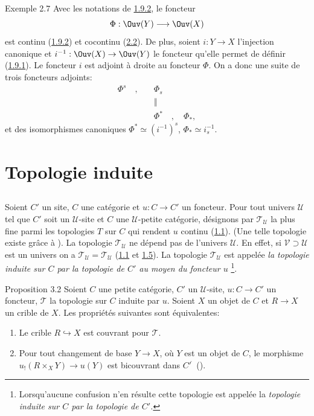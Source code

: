 \begin{enonce*}[remark]{Exemple 2.7}
Avec les notations de \hyperref[III.exem1.9.2]{1.9.2}, le foncteur
$$
\Phi:\Ouv(Y)\longrightarrow \Ouv(X)
$$
est continu (\hyperref[III.exem1.9.2]{1.9.2}) et cocontinu (\hyperref[III.prop2.2]{2.2}).
De plus, soient $i:Y\rightarrow X$ l'injection\pageoriginale
canonique et $i^{-1}:\Ouv(X)\rightarrow \Ouv(Y)$ le foncteur qu'elle
permet de définir (\hyperref[III.exem1.9.1]{1.9.1}). Le foncteur $i$ est
adjoint à droite au foncteur $\Phi$. On a donc une suite de trois
foncteurs adjoints:
\begin{align*}
\Phi^s\quad ,\quad & \Phi_s\\
        & ‖\\
        &\Phi^{\ast}\quad,\quad \Phi_{\ast},
\end{align*}
et des isomorphismes canoniques $\Phi^{\ast}\simeq (i^{-1})^s$,
$\Phi_{\ast}\simeq i^{-1}_s$.
\end{enonce*}

\section{Topologie induite}

\subsection{}
Soient $C'$ un site, $C$ une catégorie et $u:C\rightarrow C'$ un
foncteur. Pour tout univers $𝒰$ tel que $C'$ soit un
$𝒰$-site et $C$ une $𝒰$-petite catégorie, désignons
par $𝒯_{𝒰}$ la plus fine parmi les topologies $T$ sur $C$
qui rendent $u$ continu (\hyperref[III.def1.1]{1.1}). (Une telle topologie
existe grâce à ). La topologie $𝒯_{𝒰}$ ne
dépend pas de l'univers $𝒰$. En effet, si $𝒱\supset
𝒰$ est un univers on a $𝒯_{𝒰}=𝒯_{𝒰}$
(\hyperref[III.def1.1]{1.1} et \hyperref[III.prop1.5]{1.5}). La topologie
$𝒯_{𝒰}$ est appelée \emph{la topologie
  induite sur $C$ par la topologie de $C'$ au moyen du foncteur $u$}
  \footnote[1]{Lorsqu'aucune confusion n'en résulte cette topologie
    est appelée la \emph{topologie induite sur $C$ par la topologie
      de $C'$.}}.

\begin{enonce*}{Proposition 3.2}
Soient $C$ une petite catégorie, $C'$ un $𝒰$-site,
$u:C\rightarrow C'$ un foncteur, $𝒯$ la topologie sur $C$ induite
par $u$. Soient $X$ un objet de $C$ et $R\rightarrow X$ un crible de
$X$. Les propriétés suivantes sont équivalentes:
\begin{enumerate}
\renewcommand{\theenumi}{\roman{enumi}}
\renewcommand{\labelenumi}{\theenumi)}
\item Le crible $R\hookrightarrow X$ est couvrant pour $𝒯$.

\item Pour tout changement de base $Y\rightarrow X$, où $Y$ est un
  objet de $C$, le morphisme $u_{!}(R\times_X Y)\rightarrow u(Y)$ est
  bicouvrant dans ${C'}^{\widehat{\phantom{,}}}$ {\rm ().}
\end{enumerate}
\end{enonce*}

